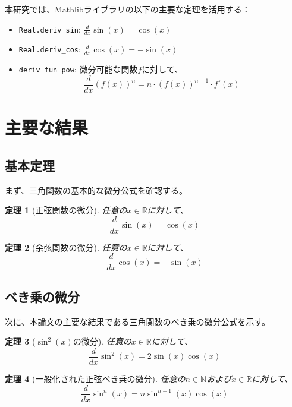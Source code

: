 \documentclass[uplatex, a4paper]{jlreq}
\newtheorem{theorem}{定理}[section]
\begin{document}
本研究では、Mathlibライブラリの以下の主要な定理を活用する：

\begin{itemize}
    \item \texttt{Real.deriv\_sin}: $\frac{d}{dx}\sin(x) = \cos(x)$
    \item \texttt{Real.deriv\_cos}: $\frac{d}{dx}\cos(x) = -\sin(x)$
    \item \texttt{deriv\_fun\_pow}: 微分可能な関数$f$に対して、
    \[
        \frac{d}{dx}(f(x))^n = n \cdot (f(x))^{n-1} \cdot f'(x)
    \]
\end{itemize}

\section{主要な結果}

\subsection{基本定理}

まず、三角関数の基本的な微分公式を確認する。

\begin{theorem}[正弦関数の微分]\label{thm:sin_deriv}
任意の$x \in \mathbb{R}$に対して、
\[
    \frac{d}{dx}\sin(x) = \cos(x)
\]
\end{theorem}

\begin{theorem}[余弦関数の微分]\label{thm:cos_deriv}
任意の$x \in \mathbb{R}$に対して、
\[
    \frac{d}{dx}\cos(x) = -\sin(x)
\]
\end{theorem}

\subsection{べき乗の微分}

次に、本論文の主要な結果である三角関数のべき乗の微分公式を示す。

\begin{theorem}[$\sin^2(x)$の微分]\label{thm:sin_squared}
任意の$x \in \mathbb{R}$に対して、
\[
    \frac{d}{dx}\sin^2(x) = 2\sin(x)\cos(x)
\]
\end{theorem}

\begin{theorem}[一般化された正弦べき乗の微分]\label{thm:sin_power}
任意の$n \in \mathbb{N}$および$x \in \mathbb{R}$に対して、
\[
    \frac{d}{dx}\sin^n(x) = n\sin^{n-1}(x)\cos(x)
\]
\end{theorem}
\end{document}
